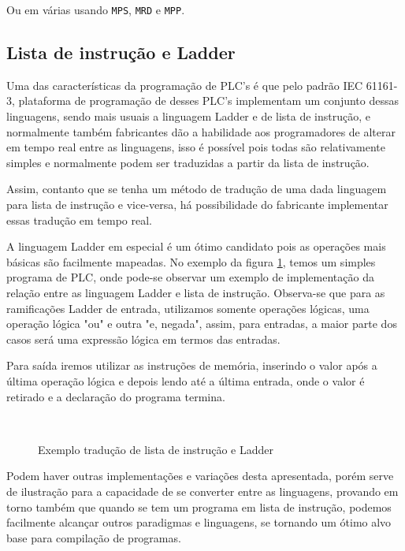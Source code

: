 Ou em várias usando \lstinline{MPS}, \lstinline{MRD} e \lstinline{MPP}.



\subsection{Lista de instrução e Ladder}

Uma das características da programação de PLC's é que pelo padrão IEC 61161-3, plataforma de programação de desses PLC's implementam um conjunto dessas linguagens, sendo mais usuais a linguagem Ladder e de lista de instrução, e normalmente também fabricantes dão a habilidade aos programadores de alterar em tempo real entre as linguagens, isso é possível pois todas são relativamente simples e normalmente podem ser traduzidas a partir da lista de instrução.

Assim, contanto que se tenha um método de tradução de uma dada linguagem para lista de instrução e vice-versa, há possibilidade do fabricante implementar essas tradução em tempo real.

A linguagem Ladder em especial é um ótimo candidato pois as operações mais básicas são facilmente mapeadas. No exemplo da figura \ref{fig:illadder}, temos um simples programa de PLC, onde pode-se observar um exemplo de implementação da relação entre as linguagem Ladder e lista de instrução. Observa-se que para as ramificações Ladder de entrada, utilizamos somente operações lógicas, uma operação lógica "ou" e outra "e, negada", assim, para entradas, a maior parte dos casos será uma expressão lógica em termos das entradas.

Para saída iremos utilizar as instruções de memória, inserindo o valor após a última operação lógica e depois lendo até a última entrada, onde o valor é retirado e a declaração do programa termina.

\begin{figure}[ht]
	\centering
	\caption{Exemplo tradução de lista de instrução e Ladder}
	\\
	\label{fig:illadder}
\end{figure}

Podem haver outras implementações e variações desta apresentada, porém serve de ilustração para a capacidade de se converter entre as linguagens, provando em torno também que quando se tem um programa em lista de instrução, podemos facilmente alcançar outros paradigmas e linguagens, se tornando um ótimo alvo base para compilação de programas.

